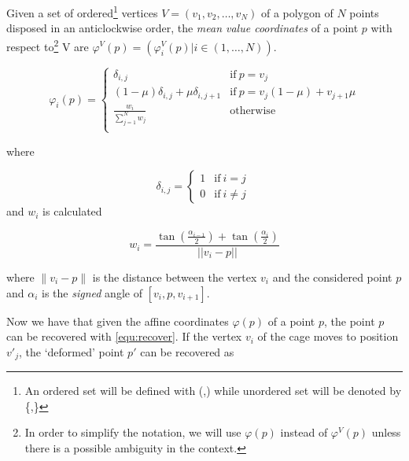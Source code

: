 Given a set of ordered\footnote{An ordered set will be defined with (,) while unordered set will be denoted by \{,\}} vertices $V=(v_1,v_2, \dots, v_N)$  of a polygon of $N$ points disposed in an anticlockwise order, 
the \textit{mean value coordinates} of a point $p$ with respect to\footnote{In order to simplify the notation, we will use $\varphi(p)$ instead of $\varphi^V(p)$ unless there is a possible ambiguity in the context.} V are $\varphi^V(p)=(\varphi_i^V(p) | i\in (1,\dots,N) )$.

\begin{equation} \label{eq:affine_coordinates}
\varphi_i(p) = 
\begin{cases} 
\delta _{i,j}& \mathrm{if}\ p = v_j \\
(1-\mu)\delta _{i,j}+ \mu \delta _{i,j+1}&  \mathrm{if}\ p=v_j(1-\mu)+v_{j+1}\mu\\
\frac{w_i}{\sum_{j=1}^N w_j} \quad & \mathrm{otherwise}\\
\end{cases}
\end{equation}

where 

\begin{equation} \label{eq:indicator_function}
\delta_{i,j}= 
\begin{cases} 
1& \mathrm{if}\  i=j \\
0&  \mathrm{if}\ i\neq j\
\end{cases}
\end{equation}
and $w_i$ is calculated %


\begin{equation}\label{eq:mean_value_coord}
w_i =\frac{\tan(\frac{\alpha_{i-1}}{2})+\tan(\frac{\alpha_i }{2})}{|| v_i - p ||} 
\end{equation}

where $\| v_i - p \|$ is the distance between the vertex $v_i$ and the considered point $p$ and $\alpha_i$ is the
\emph{signed} angle of $[v_i, p,v_{i+1} ]$.

Now we have that given the affine coordinates $\varphi(p)$ of a point $p$, the point $p$ can be recovered with \eqref{equ:recover}.
If the vertex $v_i$ of the cage moves to position
$v'_j$, the `deformed' point $p'$ can be recovered as

